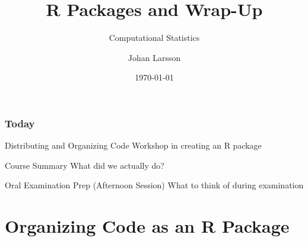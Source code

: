 \documentclass[aspectratio=1610,onlytextwidth]{beamer}
\date{\today}
\title{R Packages and Wrap-Up}
\subtitle{Computational Statistics}
\author{Johan Larsson}
\institute{Department of Mathematical Sciences, University of Copenhagen}
\begin{document}
\maketitle

%
%

%

\begin{frame}[c]
  \frametitle{Today}

  \begin{block}{Distributing and Organizing Code}
    Workshop in creating an R package
  \end{block}

  \pause

  \begin{block}{Course Summary}
    What did we actually do?
  \end{block}

  \pause

  \begin{block}{Oral Examination Prep (Afternoon Session)}
    What to think of during examination
  \end{block}
\end{frame}

\section{Organizing Code as an R Package}
\end{document}
